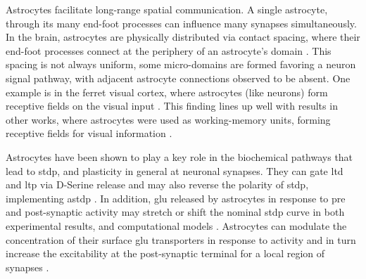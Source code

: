 \documentclass[conference]{IEEEtran}
\begin{document}
Astrocytes facilitate long-range spatial communication. A single astrocyte,
through its many end-foot processes can influence many synapses
simultaneously. In the brain, astrocytes are physically distributed via contact
spacing, where their end-foot processes connect at the periphery of an
astrocyte's domain \parencite{pitta_2012}. This spacing is not always uniform,
some micro-domains are formed favoring a neuron signal pathway, with adjacent
astrocyte connections observed to be absent. One example is in the ferret visual
cortex, where astrocytes (like neurons) form receptive fields on the visual
input \parencite{pitta_2012}. This finding lines up well with results in other
works, where astrocytes were used as working-memory units, forming receptive
fields for visual information \parencite{gordleeva_2021}.


Astrocytes have been shown to play a key role in the biochemical pathways that
lead to \gls{stdp}, and plasticity in general at neuronal synapses. They can
gate \gls{ltd} and \gls{ltp} via D-Serine release \parencite{manninen_2019} and
may also reverse the polarity of \gls{stdp}, implementing \gls{astdp}
\parencite{min_2012}. In addition, \Gls{glu} released by astrocytes in response
to pre and post-synaptic activity may stretch or shift the nominal \gls{stdp}
curve in both experimental results, and computational models
\parencite{pitta_2016}. Astrocytes can modulate the concentration of their
surface \gls{glu} transporters in response to activity and in turn increase the
excitability at the post-synaptic terminal for a local region of synapses
\parencite{mederos_2018}.
\end{document}

